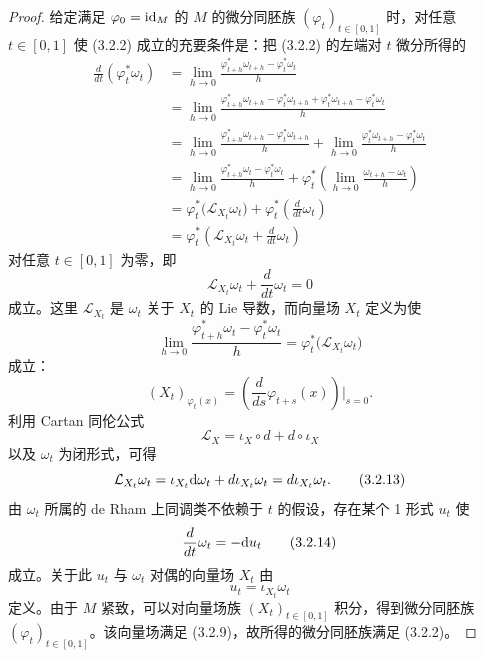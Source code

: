 \begin{proof}
  给定满足 $\varphi_0=\mathrm{id}_M$ 的 $M$ 的微分同胚族 $(\varphi_t)_{t\in[0,1]}$ 时，对任意 $t\in[0,1]$ 使 (3.2.2) 成立的充要条件是：把 (3.2.2) 的左端对 $t$ 微分所得的
  \begin{align}
    \frac{d}{dt}(\varphi_t^*\omega_t)
    &=\lim_{h\to0}\frac{\varphi_{t+h}^*\omega_{t+h}-\varphi_t^*\omega_t}{h} \tag{3.2.3}\\
    &=\lim_{h\to0}\frac{\varphi_{t+h}^*\omega_{t+h}-\varphi_t^*\omega_{t+h}+\varphi_t^*\omega_{t+h}-\varphi_t^*\omega_t}{h} \tag{3.2.4}\\
    &=\lim_{h\to0}\frac{\varphi_{t+h}^*\omega_{t+h}-\varphi_t^*\omega_{t+h}}{h}
      +\lim_{h\to0}\frac{\varphi_t^*\omega_{t+h}-\varphi_t^*\omega_t}{h} \tag{3.2.5}\\
    &=\lim_{h\to0}\frac{\varphi_{t+h}^*\omega_t-\varphi_t^*\omega_t}{h}
      +\varphi_t^*\left(\lim_{h\to0}\frac{\omega_{t+h}-\omega_t}{h}\right) \tag{3.2.6}\\
    &=\varphi_t^*\bigl(\mathcal L_{X_t}\omega_t\bigr)+\varphi_t^*\left(\frac{d}{dt}\omega_t\right) \tag{3.2.7}\\
    &=\varphi_t^*\left(\mathcal L_{X_t}\omega_t+\frac{d}{dt}\omega_t\right) \tag{3.2.8}
  \end{align}
  对任意 $t\in[0,1]$ 为零，即
  \begin{equation}
    \mathcal L_{X_t}\omega_t+\frac{d}{dt}\omega_t=0
    \tag{3.2.9}
  \end{equation}
  成立。这里 $\mathcal L_{X_t}$ 是 $\omega_t$ 关于 $X_t$ 的 Lie 导数，而向量场 $X_t$ 定义为使
  \begin{equation}
    \lim_{h\to0}\frac{\varphi_{t+h}^*\omega_t-\varphi_t^*\omega_t}{h}=\varphi_t^*\bigl(\mathcal L_{X_t}\omega_t\bigr)
    \tag{3.2.10}
  \end{equation}
  成立：
  \begin{equation}
    (X_t)_{\varphi_t(x)}=\left(\frac{d}{ds}\varphi_{t+s}(x)\right)\Big|_{s=0}.
    \tag{3.2.11}
  \end{equation}
  利用 Cartan 同伦公式
  \begin{equation}
    \mathcal L_X=\iota_X\circ d+d\circ\iota_X
    \tag{3.2.12}
  \end{equation}
  以及 $\omega_t$ 为闭形式，可得
  \begin{equation}
    \mathcal L_{X_t}\omega_t=\iota_{X_t}\mathrm{d}\omega_t+d\iota_{X_t}\omega_t=d\iota_{X_t}\omega_t.
    \tag{3.2.13}
  \end{equation}
  由 $\omega_t$ 所属的 de Rham 上同调类不依赖于 $t$ 的假设，存在某个 1 形式 $u_t$ 使
  \begin{equation}
    \frac{d}{dt}\omega_t=-\mathrm{d} u_t
    \tag{3.2.14}
  \end{equation}
  成立。关于此 $u_t$ 与 $\omega_t$ 对偶的向量场 $X_t$ 由
  \begin{equation}
    u_t=\iota_{X_t}\omega_t
    \tag{3.2.15}
  \end{equation}
  定义。由于 $M$ 紧致，可以对向量场族 $(X_t)_{t\in[0,1]}$ 积分，得到微分同胚族 $(\varphi_t)_{t\in[0,1]}$。该向量场满足 (3.2.9)，故所得的微分同胚族满足 (3.2.2)。
\end{proof}
